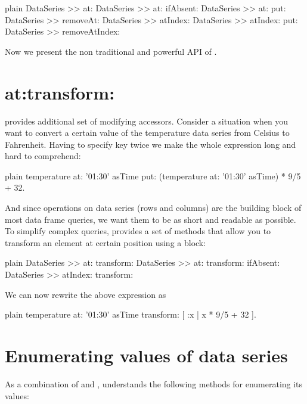 \documentclass[10pt,twoside,english]{_support/latex/sbabook/sbabook}
\begin{document}
\begin{displaycode}{plain}
DataSeries >> at:
DataSeries >> at: ifAbsent:
DataSeries >> at: put:
DataSeries >> removeAt:
DataSeries >> atIndex:
DataSeries >> atIndex: put:
DataSeries >> removeAtIndex:
\end{displaycode}

Now we present the non traditional and powerful API of .
\section{at:transform:}\label{secAtTransform}
 provides additional set of  modifying accessors. Consider a situation when you want to convert a certain value of the temperature data series from Celsius to Fahrenheit. Having to specify key twice we make the whole expression long and hard to comprehend:

\begin{displaycode}{plain}
temperature at: '01:30' asTime put: (temperature at: '01:30' asTime)  * 9/5 + 32.
\end{displaycode}

And since operations on data series (rows and columns) are the building block of most data frame queries, we want them to be as short and readable as possible. To simplify complex queries,  provides a set of methods that allow you to transform an element at certain position using a block:

\begin{displaycode}{plain}
DataSeries >> at: transform:
DataSeries >> at: transform: ifAbsent:
DataSeries >> atIndex: transform:
\end{displaycode}

We can now rewrite the above expression as

\begin{displaycode}{plain}
temperature at: '01:30' asTime transform: [ :x | x * 9/5 + 32 ].
\end{displaycode}
\section{Enumerating values of data series}\label{secEnumeratingSeries}
As a combination of  and ,  understands the following methods for enumerating its values:
\end{document}
